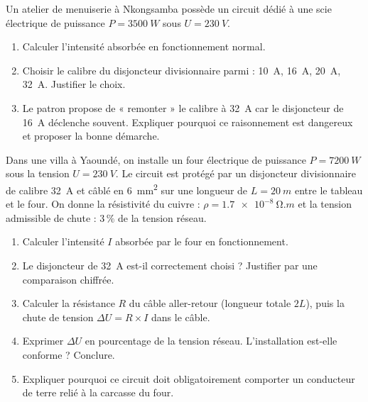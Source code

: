 \documentclass[11pt]{article}
\newcounter{popsec}
\newcounter{popsub}
\newcommand{\courssub}[1]{%
  \stepcounter{popsub}%
  \par\vspace{9pt}\noindent{\popxbold\fontsize{11.5}{13}\selectfont\color{popink}{\color{poporange}\thepopsec.\thepopsub}\hspace{6pt}#1}\par\nopagebreak\vspace{4pt}
}
\begin{document}
\begin{exercice}
Un atelier de menuiserie à Nkongsamba possède un circuit dédié à une scie électrique de puissance $P = \SI{3500}{W}$ sous $U = \SI{230}{V}$.
\begin{enumerate}
\item Calculer l'intensité absorbée en fonctionnement normal.
\item Choisir le calibre du disjoncteur divisionnaire parmi : \SI{10}{A}, \SI{16}{A}, \SI{20}{A}, \SI{32}{A}. Justifier le choix.
\item Le patron propose de « remonter » le calibre à \SI{32}{A} car le disjoncteur de \SI{16}{A} déclenche souvent. Expliquer pourquoi ce raisonnement est dangereux et proposer la bonne démarche.
\end{enumerate}
\end{exercice}

\courssub{Je me prépare au Bac}

\begin{exercice}
Dans une villa à Yaoundé, on installe un four électrique de puissance $P = \SI{7200}{W}$ sous la tension $U = \SI{230}{V}$. Le circuit est protégé par un disjoncteur divisionnaire de calibre \SI{32}{A} et câblé en \SI{6}{mm^2} sur une longueur de $L = \SI{20}{m}$ entre le tableau et le four. On donne la résistivité du cuivre : $\rho = \SI{1,7e-8}{\ohm.m}$ et la tension admissible de chute : $3\,\%$ de la tension réseau.
\begin{enumerate}
\item Calculer l'intensité $I$ absorbée par le four en fonctionnement.
\item Le disjoncteur de \SI{32}{A} est-il correctement choisi ? Justifier par une comparaison chiffrée.
\item Calculer la résistance $R$ du câble aller-retour (longueur totale $2L$), puis la chute de tension $\Delta U = R \times I$ dans le câble.
\item Exprimer $\Delta U$ en pourcentage de la tension réseau. L'installation est-elle conforme ? Conclure.
\item Expliquer pourquoi ce circuit doit obligatoirement comporter un conducteur de terre relié à la carcasse du four.
\end{enumerate}
\end{exercice}
\end{document}
